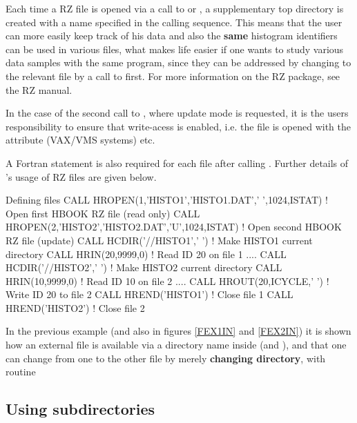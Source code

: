 Each time a RZ file is opened via a
%
call to  or ,
a supplementary top directory is created with
a name specified in the calling sequence. This
means that the user can more easily keep track of his data
and also the {\bf same} histogram identifiers can be used
in various files, what makes life easier if one wants to study various
data samples with the same program,
since they can be addressed by changing
to the relevant file by a call to  first.
For more information on the RZ package, see the \ZEBRA{} RZ manual.

In the case of the second call to , where update mode is 
requested, it is the users responsibility to ensure that write-acess is 
enabled, i.e.  the file is opened with the  attribute 
(VAX/VMS systems) etc.

A Fortran  statement is also required for each file
after calling . 
Further details of \HBOOK's usage of \ZEBRA{} RZ files are given below.

\begin{XMPt}{Defining \HBOOK{} files}
 CALL HROPEN(1,'HISTO1','HISTO1.DAT',' ',1024,ISTAT)    ! Open first  HBOOK RZ file (read only)
 CALL HROPEN(2,'HISTO2','HISTO2.DAT','U',1024,ISTAT)    ! Open second HBOOK RZ file (update)
 CALL HCDIR('//HISTO1',' ')                             ! Make HISTO1 current directory
 CALL HRIN(20,9999,0)                                   ! Read ID 20 on file 1
   ....
 CALL HCDIR('//HISTO2',' ')                             ! Make HISTO2 current directory
 CALL HRIN(10,9999,0)                                   ! Read ID 10 on file 2
   ....
 CALL HROUT(20,ICYCLE,' ')                              ! Write ID 20 to file 2
 CALL HREND('HISTO1')                                   ! Close file 1
 CALL HREND('HISTO2')                                   ! Close file 2
\end{XMPt}
      
In the previous example (and also in figures \ref{FEX1IN}
and \ref{FEX2IN}) it is shown how an external file
is available via a directory name inside \HBOOK{} (and \PAW{}), and that one
can change from one to the other file by merely
{\bf changing directory}, with \HBOOK{} routine 

\subsection*{Using subdirectories}

